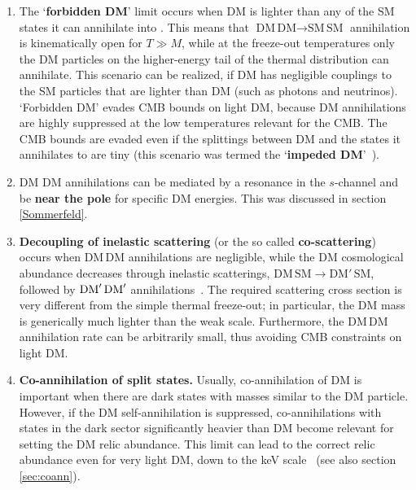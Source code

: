 \begin{enumerate}
\item The `{\bf forbidden DM}' limit occurs when DM is lighter than any of the SM states it can annihilate into \cite{Forbidden:DM}. 
This means that $\text{DM}\,\text{DM}\to \text{SM}\,\text{SM}$ annihilation is kinematically open for $T \gg M$, 
while at the freeze-out temperatures only the DM particles on the higher-energy tail of the thermal distribution can annihilate. 
This scenario can be realized, if DM has negligible couplings to the SM particles that are lighter than DM (such as photons and neutrinos).
`Forbidden DM' evades CMB bounds on light DM, because DM annihilations are highly suppressed at the low temperatures relevant for the CMB. 
The CMB bounds are evaded even if the splittings between DM and the states it annihilates to are tiny (this scenario was termed the `{\bf impeded DM}'~\cite{1609.02147}). 

\item DM DM annihilations can be mediated by a resonance in the $s$-channel and be {\bf near the pole} for specific DM energies. 
This was discussed in section \ref{Sommerfeld}.

\item {\bf Decoupling of inelastic scattering} (or the so called {\bf co-scattering}) occurs when $\text{DM}\,\text{DM}$ annihilations are negligible, while 
the DM cosmological abundance decreases through inelastic scatterings, 
$\text{DM}\,\text{SM}\to \text{DM}'\, \text{SM}$, followed by ${\rm DM}'\,{\rm DM}'$ annihilations~\cite{1705.08450}. 
The required scattering cross section is very different from the simple thermal freeze-out; 
in particular, the DM mass is generically much lighter than the weak scale. 
Furthermore, the $\text{DM}\,\text{DM}$ annihilation rate can be arbitrarily small, thus avoiding CMB constraints on light DM. 

\item {\bf Co-annihilation of split states.} Usually, co-annihilation of DM is important when there are dark states with masses similar to the DM particle.
However, if the DM self-annihilation is suppressed, co-annihilations with states in the dark sector significantly heavier than DM
become relevant for setting the DM relic abundance. 
This limit can lead to the correct relic abundance even for very light DM, down to the keV scale~\cite{1803.02901} (see also section \ref{sec:coann}). 
\end{enumerate}

